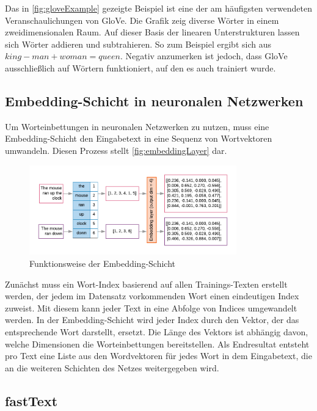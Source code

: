 Das in \autoref{fig:gloveExample} gezeigte Beispiel ist eine der am häufigsten verwendeten Veranschaulichungen von \ac{GloVe}. Die Grafik zeig diverse Wörter in einem zweidimensionalen Raum. Auf dieser Basis der linearen Unterstrukturen lassen sich Wörter addieren und subtrahieren. So zum Beispiel ergibt sich aus \(king - man + woman = queen\). Negativ anzumerken ist jedoch, dass \ac{GloVe} ausschließlich auf Wörtern funktioniert, auf den es auch trainiert wurde.

\subsection*{Embedding-Schicht in neuronalen Netzwerken}

Um Worteinbettungen in neuronalen Netzwerken zu nutzen, muss eine Embedding-Schicht den Eingabetext in eine Sequenz von Wortvektoren umwandeln. Diesen Prozess stellt \autoref{fig:embeddingLayer} dar.

\begin{figure}[H]
  \centering
  \includegraphics[width=0.8\textwidth]{data/images/embedding_layer.png}
  \caption{Funktionsweise der Embedding-Schicht \autocite{google_prepare_2022}} \label{fig:embeddingLayer}
\end{figure}

Zunächst muss ein Wort-Index basierend auf allen Trainings-Texten erstellt werden, der jedem im Datensatz vorkommenden Wort einen eindeutigen Index zuweist. Mit diesem kann jeder Text in eine Abfolge von Indices umgewandelt werden. In der Embedding-Schicht wird jeder Index durch den Vektor, der das entsprechende Wort darstellt, ersetzt. Die Länge des Vektors ist abhängig davon, welche Dimensionen die Worteinbettungen bereitstellen. Als Endresultat entsteht pro Text eine Liste aus den Wordvektoren für jedes Wort in dem Eingabetext, die an die weiteren Schichten des Netzes weitergegeben wird.

\subsection*{fastText}


